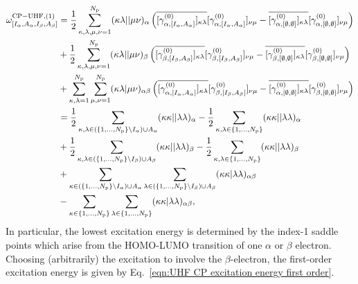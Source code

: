 \documentclass[11pt]{article}
\begin{document}
\begin{align*}
    \omega_{[I_\alpha,A_\alpha,I_\beta,A_\beta]}^{\rm CP-UHF,(1)}&=\frac12\sum_{\kappa,\lambda,\mu,\nu=1}^{N_{\rm p}}(\kappa\lambda||\mu\nu)_{\alpha}\left(\overline{[\gamma_{\alpha,[I_\alpha,A_\alpha]}^{(0)}]_{\kappa\lambda}}[\gamma_{\alpha,[I_\alpha,A_\alpha]}^{(0)}]_{\nu\mu}-\overline{[\gamma_{\alpha,[\emptyset,\emptyset]}^{(0)}]_{\kappa\lambda}}[\gamma_{\alpha,[\emptyset,\emptyset]}^{(0)}]_{\nu\mu}\right)\\
    &+\frac12\sum_{\kappa,\lambda,\mu,\nu=1}^{N_{\rm p}}(\kappa\lambda||\mu\nu)_{\beta}\left(\overline{[\gamma_{\beta,[I_\beta,A_\beta]}^{(0)}]_{\kappa\lambda}}[\gamma_{\beta,[I_\beta,A_\beta]}^{(0)}]_{\nu\mu}-\overline{[\gamma_{\beta,[\emptyset,\emptyset]}^{(0)}]_{\kappa\lambda}}[\gamma_{\beta,[\emptyset,\emptyset]}^{(0)}]_{\nu\mu}\right)\\
    &+\sum_{\kappa,\lambda=1}^{N_{\rm p}}\sum_{\mu,\nu=1}^{N_{\rm p}}(\kappa\lambda|\mu\nu)_{\alpha\beta}\left(\overline{[\gamma_{\alpha,[I_\alpha,A_\alpha]}^{(0)}]_{\kappa\lambda}}[\gamma_{\beta,[I_\beta,A_\beta]}^{(0)}]_{\nu\mu}-\overline{[\gamma_{\alpha,[\emptyset,\emptyset]}^{(0)}]_{\kappa\lambda}}[\gamma_{\beta,[\emptyset,\emptyset]}^{(0)}]_{\nu\mu}\right)\\
    &=\frac12\sum_{\kappa,\lambda\in(\{1,\ldots,N_{\rm p}\}\setminus I_\alpha)\cup A_\alpha}(\kappa\kappa||\lambda\lambda)_\alpha-\frac12\sum_{\kappa,\lambda\in\{1,\ldots,N_{\rm p}\}}(\kappa\kappa||\lambda\lambda)_\alpha\\
    &+\frac12\sum_{\kappa,\lambda\in(\{1,\ldots,N_{\rm p}\}\setminus I_\beta)\cup A_\beta}(\kappa\kappa||\lambda\lambda)_\beta-\frac12\sum_{\kappa,\lambda\in\{1,\ldots,N_{\rm p}\}}(\kappa\kappa||\lambda\lambda)_\beta\\
    &+\sum_{\kappa\in(\{1,\ldots,N_{\rm p}\}\setminus I_\alpha)\cup A_\alpha}\sum_{\lambda\in(\{1,\ldots,N_{\rm p}\}\setminus I_\beta)\cup A_\beta}(\kappa \kappa |\lambda \lambda )_{\alpha\beta}\\
    &-\sum_{\kappa\in\{1,\ldots,N_{\rm p}\}}\sum_{\lambda\in\{1,\ldots,N_{\rm p}\}}(\kappa \kappa |\lambda \lambda )_{\alpha\beta},
\end{align*}
In particular, the lowest excitation energy is determined by the index-1 saddle points which arise from the HOMO-LUMO transition of one $\alpha$ or $\beta$ electron. Choosing (arbitrarily) the excitation to involve the $\beta$-electron, the first-order excitation energy is given by Eq.~\eqref{eqn:UHF CP excitation energy first order}.
\end{document}
